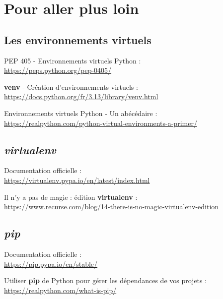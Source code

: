 \chapter{Pour aller plus loin}

\section*{Les environnements virtuels}
\begin{coloredenum}
    \item PEP 405 - Environnements virtuels Python :\\ \url{https://peps.python.org/pep-0405/}
    \item \textbf{venv} - Création d'environnements virtuels :\\ \url{https://docs.python.org/fr/3.13/library/venv.html}
    \item Environnements virtuels Python - Un abécédaire : \\ \url{https://realpython.com/python-virtual-environments-a-primer/}
\end{coloredenum}

\section*{\textit{virtualenv}}
\begin{coloredenum}
    \item Documentation officielle :\\ \url{https://virtualenv.pypa.io/en/latest/index.html}
    \item Il n'y a pas de magie : édition \textbf{virtualenv} :\\ \url{https://www.recurse.com/blog/14-there-is-no-magic-virtualenv-edition}
\end{coloredenum}

\section*{\textit{pip}}
\begin{coloredenum}
    \item Documentation officielle :\\ \url{https://pip.pypa.io/en/stable/}
    \item Utiliser \textbf{pip} de Python pour gérer les dépendances de vos projets :\\ \url{https://realpython.com/what-is-pip/}
\end{coloredenum}


